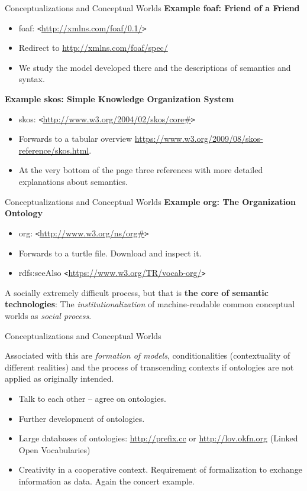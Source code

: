 \documentclass{beamer}
\def\lt{\texttt{<}}
\def\gt{\texttt{>}}
\begin{document}
\begin{frame}{Conceptualizations and Conceptual Worlds}
\textbf{Example foaf: Friend of a Friend}
\begin{itemize}
\item foaf: {\lt}\url{http://xmlns.com/foaf/0.1/}{\gt}
\item Redirect to \url{http://xmlns.com/foaf/spec/}
\item We study the model developed there and the descriptions of semantics and
  syntax.
\end{itemize}

\textbf{Example skos: Simple Knowledge Organization System}
\begin{itemize}
\item skos: {\lt}\url{http://www.w3.org/2004/02/skos/core\#}{\gt}
\item Forwards to a tabular overview
  \url{https://www.w3.org/2009/08/skos-reference/skos.html}.
\item At the very bottom of the page three references with more detailed
  explanations about semantics.
\end{itemize}
\end{frame}

\begin{frame}{Conceptualizations and Conceptual Worlds}
\textbf{Example org: The Organization Ontology}
\begin{itemize}
\item org: {\lt}\url{http://www.w3.org/ns/org\#}{\gt}
\item Forwards to a turtle file. Download and inspect it.
\item rdfs:seeAlso {\lt}\url{https://www.w3.org/TR/vocab-org/}{\gt}
\end{itemize}

A socially extremely difficult process, but that is \textbf{the core of
  semantic technologies}: The \emph{institutionalization} of machine-readable
common conceptual worlds as \emph{social process}.

\end{frame}

\begin{frame}{Conceptualizations and Conceptual Worlds}

Associated with this are \emph{formation of models}, conditionalities
(contextuality of different realities) and the process of transcending
contexts if ontologies are not applied as originally intended.
\begin{itemize}
\item Talk to each other -- agree on ontologies.
\item Further development of ontologies.
\item Large databases of ontologies: \url{http://prefix.cc} or
  \url{http://lov.okfn.org} (Linked Open Vocabularies)
\item Creativity in a cooperative context. Requirement of formalization to
  exchange information as data.  Again the concert example.
\end{itemize}
\end{frame}
\end{document}
